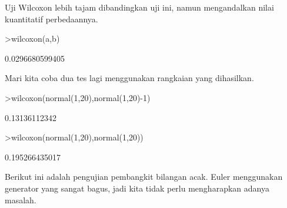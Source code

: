 \documentclass[a4paper,10pt]{article}
\begin{document}
\begin{eulernotebook}
\begin{eulercomment}
\begin{eulercomment}
\begin{eulercomment}
\begin{eulercomment}
\begin{eulercomment}
Uji Wilcoxon lebih tajam dibandingkan uji ini, namun mengandalkan
nilai kuantitatif perbedaannya.
\end{eulercomment}
\begin{eulerprompt}
>wilcoxon(a,b)
\end{eulerprompt}
\begin{euleroutput}
  0.0296680599405
\end{euleroutput}
\begin{eulercomment}
Mari kita coba dua tes lagi menggunakan rangkaian yang dihasilkan.
\end{eulercomment}
\begin{eulerprompt}
>wilcoxon(normal(1,20),normal(1,20)-1)
\end{eulerprompt}
\begin{euleroutput}
  0.13136112342
\end{euleroutput}
\begin{eulerprompt}
>wilcoxon(normal(1,20),normal(1,20))
\end{eulerprompt}
\begin{euleroutput}
  0.195266435017
\end{euleroutput}
\begin{eulercomment}
Berikut ini adalah pengujian pembangkit bilangan acak. Euler
menggunakan generator yang sangat bagus, jadi kita tidak perlu
mengharapkan adanya masalah.


\end{eulercomment}
\end{eulercomment}
\end{eulercomment}
\end{eulercomment}
\end{eulercomment}
\end{eulernotebook}
\end{document}
